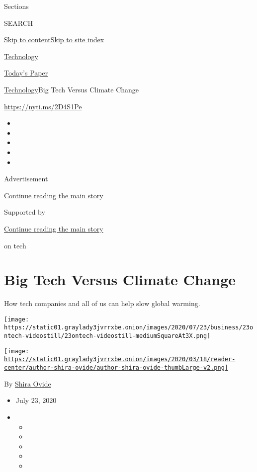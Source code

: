 Sections

SEARCH

\protect\hyperlink{site-content}{Skip to
content}\protect\hyperlink{site-index}{Skip to site index}

\href{https://www.nytimes3xbfgragh.onion/section/technology}{Technology}

\href{https://myaccount.nytimes3xbfgragh.onion/auth/login?response_type=cookie\&client_id=vi}{}

\href{https://www.nytimes3xbfgragh.onion/section/todayspaper}{Today's
Paper}

\href{/section/technology}{Technology}\textbar{}Big Tech Versus Climate
Change

\url{https://nyti.ms/2D4S1Pe}

\begin{itemize}
\item
\item
\item
\item
\item
\end{itemize}

Advertisement

\protect\hyperlink{after-top}{Continue reading the main story}

Supported by

\protect\hyperlink{after-sponsor}{Continue reading the main story}

on tech

\hypertarget{big-tech-versus-climate-change}{%
\section{Big Tech Versus Climate
Change}\label{big-tech-versus-climate-change}}

How tech companies and all of us can help slow global warming.

\texttt{[image: https://static01.graylady3jvrrxbe.onion/images/2020/07/23/business/23ontech-videostill/23ontech-videostill-mediumSquareAt3X.png]}

\href{https://www.nytimes3xbfgragh.onion/by/shira-ovide}{\texttt{[image: https://static01.graylady3jvrrxbe.onion/images/2020/03/18/reader-center/author-shira-ovide/author-shira-ovide-thumbLarge-v2.png]}}

By \href{https://www.nytimes3xbfgragh.onion/by/shira-ovide}{Shira Ovide}

\begin{itemize}
\item
  July 23, 2020
\item
  \begin{itemize}
  \item
  \item
  \item
  \item
  \item
  \end{itemize}
\end{itemize}

